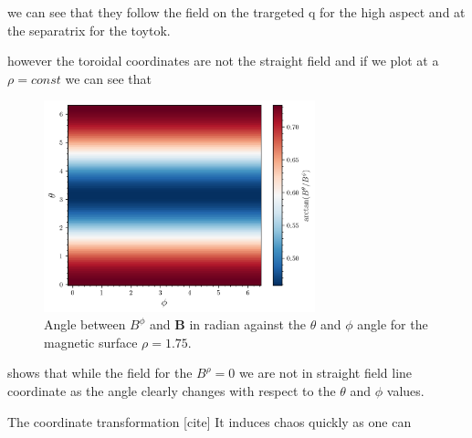 we can see that they follow the field on the trargeted q for the high aspect and at the separatrix for the toytok. 

however the toroidal coordinates are not the straight field and if we plot at a $\rho = const$ we can see that

\begin{figure}[H]
    \centering
    \includegraphics[width=0.7\textwidth]{images/high-aspect-ratio/fieldlines.png}
    \caption{Angle between $B^\phi$ and $\textbf{B}$ in radian against the $\theta$ and $\phi$ angle for the magnetic surface $\rho = 1.75$.\label{fig:mode-mixing}}
\end{figure}

 shows that while the field for the $B^\rho = 0$ we are not in straight field line coordinate as the angle clearly changes with respect to the $\theta$ and $\phi$ values. 

The coordinate transformation [cite] 
It induces chaos quickly as one can 

